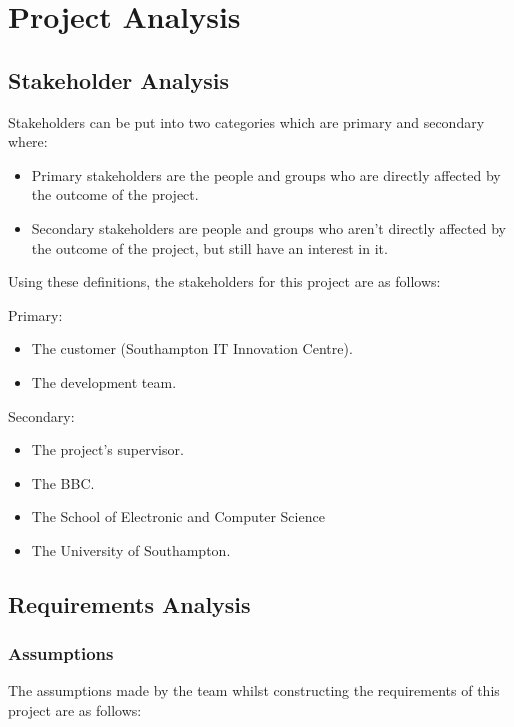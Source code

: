 \section{Project Analysis}


\subsection{Stakeholder Analysis}

Stakeholders can be put into two categories which are primary and secondary where:
\begin{itemize}
\item{Primary stakeholders are the people and groups who are directly affected by the outcome of the project.}
\item{Secondary stakeholders are people and groups who aren’t directly affected by the outcome of the project, but still have an interest in it.}
\end{itemize}

Using these definitions, the stakeholders for this project are as follows:

Primary:
	\begin{itemize}
	\item{The customer (Southampton IT Innovation Centre).}
	\item{The development team.}
	\end{itemize}
Secondary:
	\begin{itemize}
	\item{The project’s supervisor.}
	\item{The BBC.}
	\item{The School of Electronic and Computer Science}
	\item{The University of Southampton.}
	\end{itemize}

\subsection{Requirements Analysis}
\label{sec:Requirements}

\subsubsection{Assumptions}
The assumptions made by the team whilst constructing the requirements of this project are as follows:

